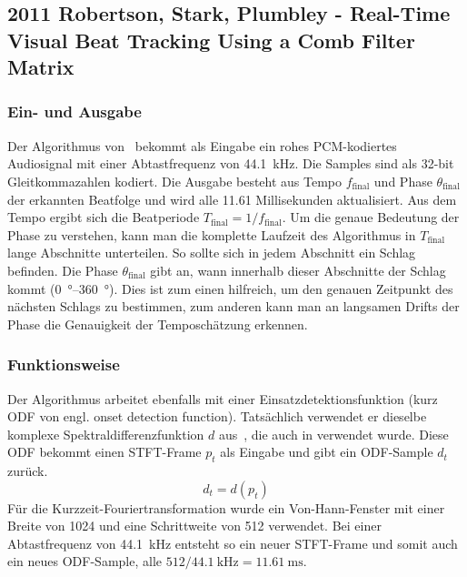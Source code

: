 	\subsection{2011 Robertson, Stark, Plumbley - Real-Time Visual Beat Tracking Using a Comb Filter Matrix}
	{
		\subsubsection*{Ein- und Ausgabe}
		{
			Der Algorithmus von~\cite{2011_PlRoSt} bekommt als Eingabe ein rohes PCM-kodiertes Audiosignal mit einer Abtastfrequenz von \SI{44.1}{\kilo\hertz}.
			Die Samples sind als 32-bit Gleitkommazahlen kodiert.
			Die Ausgabe besteht aus Tempo $f_\text{final}$ und Phase $\theta_\text{final}$ der erkannten Beatfolge
				und wird alle \num{11.61} Millisekunden aktualisiert.
			Aus dem Tempo ergibt sich die Beatperiode $T_\text{final} = 1 / f_\text{final}$.
			Um die genaue Bedeutung der Phase zu verstehen,
				kann man die komplette Laufzeit des Algorithmus in $T_\text{final}$ lange Abschnitte unterteilen.
			So sollte sich in jedem Abschnitt ein Schlag befinden.
			Die Phase $\theta_\text{final}$ gibt an,
				wann innerhalb dieser Abschnitte der Schlag kommt (\SIrange{0}{360}{\degree}).
			Dies ist zum einen hilfreich,
				um den genauen Zeitpunkt des nächsten Schlags zu bestimmen,
				zum anderen kann man an langsamen Drifts der Phase die Genauigkeit der Temposchätzung erkennen.
		}

		\subsubsection*{Funktionsweise}
		{
			Der Algorithmus arbeitet ebenfalls mit einer Einsatzdetektionsfunktion (kurz ODF von engl. onset detection function).
			Tatsächlich verwendet er dieselbe komplexe Spektraldifferenzfunktion $d$ aus~\cite{2004_BeDaDuSa},
				die auch in \cite{2009_DaPlSt} verwendet wurde.
			Diese ODF bekommt einen STFT-Frame $p_t$ als Eingabe und gibt ein ODF-Sample $d_t$ zurück.
			\begin{equation}
				d_t = d(p_t)
			\end{equation}
			Für die Kurzzeit-Fouriertransformation wurde ein Von-Hann-Fenster mit einer Breite von \num{1024} und eine Schrittweite von \num{512} verwendet.
			Bei einer Abtastfrequenz von \SI{44.1}{\kilo\hertz} entsteht so ein neuer STFT-Frame
				und somit auch ein neues ODF-Sample,
				alle $512 / \SI{44.1}{\kilo\hertz} = \SI{11.61}{\milli\second}$.

}}

